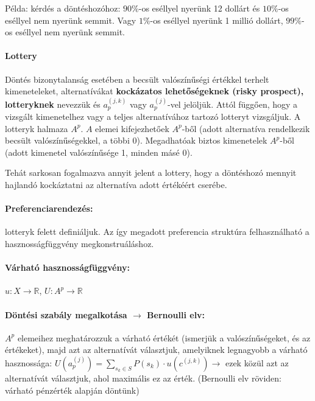 \documentclass[a4paper,12pt]{article}
\begin{document}
Példa: kérdés a döntéshozóhoz: $90\%$-os eséllyel nyerünk 12 dollárt és $10\%$-os eséllyel nem nyerünk semmit. Vagy $1\%$-os eséllyel nyerünk 1 millió dollárt, $99\%$-os eséllyel nem nyerünk semmit.

\paragraph{Lottery} Döntés bizonytalanság esetében a becsült valószínűségi értékkel terhelt kimeneteleket, alternatívákat \textbf{kockázatos lehetőségeknek (risky prospect), lotteryknek} nevezzük és $a^{(j,k)}_p$ vagy $a^{(j)}_p$-vel jelöljük. Attól függően, hogy a vizsgált kimenetelhez vagy a teljes alternatívához tartozó lotteryt vizsgáljuk.  A lotteryk halmaza $A^p$.  $A$ elemei kifejezhetőek $A^p$-ből (adott alternatíva rendelkezik becsült valószínűségekkel, a többi 0). Megadhatóak biztos kimenetelek $A^p$-ből (adott kimenetel valószínűsége 1, minden másé 0).

Tehát sarkosan fogalmazva annyit jelent a lottery, hogy a döntéshozó mennyit hajlandó kockáztatni az alternatíva adott értékéért cserébe.

\paragraph{Preferenciarendezés: } lotteryk felett definiáljuk. Az így megadott preferencia struktúra felhasználható a hasznosságfüggvény megkonstruáláshoz. %

\paragraph{Várható hasznosságfüggvény:} $u: X \rightarrow \mathbb{R}$,  $U: A^p \rightarrow \mathbb{R}$


\paragraph{Döntési szabály megalkotása  $\rightarrow$ Bernoulli elv: } $A^p$ elemeihez meghatározzuk a várható értékét (ismerjük a valószínűségeket, és az értékeket), majd azt az alternatívát választjuk, amelyiknek legnagyobb a várható hasznossága: $U(a^{(j)}_p)= \sum_{s_k \in S} P(s_k)\cdot u(c^{(j,k)}) \rightarrow$ ezek közül azt az alternatívát választjuk, ahol maximális ez az érték. (Bernoulli elv röviden: várható pénzérték alapján döntünk)
\end{document}
